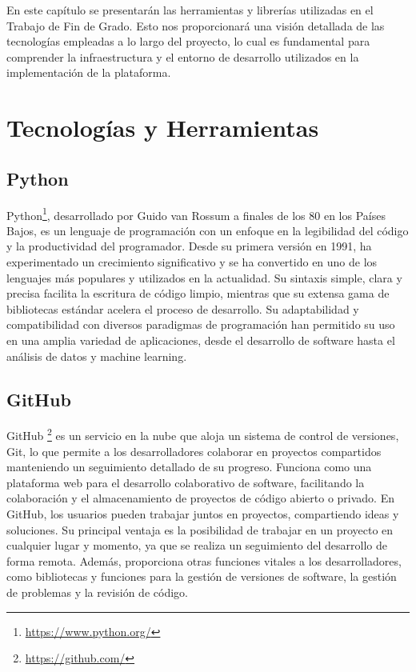 \documentclass[a4paper, 12pt]{book}
\begin{document}
En este capítulo se presentarán las herramientas y librerías utilizadas en el Trabajo de Fin de Grado. Esto nos proporcionará una visión detallada de las tecnologías empleadas a lo largo del proyecto, lo cual es fundamental para comprender la infraestructura y el entorno de desarrollo utilizados en la implementación de la plataforma.

\section{Tecnologías y Herramientas}
\label{sec:tecnologias y herramientas}

\subsection{Python} 
\label{subsec:Python} 
Python\footnote{\url{https://www.python.org/}}, desarrollado por Guido van Rossum a finales de los 80 en los Países Bajos, es un lenguaje 
de programación con un enfoque en la legibilidad del código y la productividad del programador. Desde su primera versión en 1991, ha 
experimentado un crecimiento significativo y se ha convertido en uno de los lenguajes más populares y utilizados en la actualidad. Su sintaxis simple, 
clara y precisa facilita la escritura de código limpio, mientras que su extensa gama de bibliotecas estándar acelera el proceso de desarrollo. 
Su adaptabilidad y compatibilidad con diversos paradigmas de programación han permitido su uso en una amplia variedad de aplicaciones, desde el 
desarrollo de software hasta el análisis de datos y machine learning.

\subsection{GitHub} 
\label{subsec:github} 
GitHub \footnote{\url{https://github.com/}} es un servicio en la nube que aloja un sistema de control de versiones, Git, lo que permite a los 
desarrolladores colaborar en proyectos compartidos manteniendo un seguimiento detallado de su progreso. Funciona como una plataforma web para el 
desarrollo colaborativo de software, facilitando la colaboración y el almacenamiento de proyectos de código abierto o privado. En GitHub, los usuarios 
pueden trabajar juntos en proyectos, compartiendo ideas y soluciones. Su principal ventaja es la posibilidad de trabajar en un proyecto en cualquier 
lugar y momento, ya que se realiza un seguimiento del desarrollo de forma remota. Además, proporciona otras funciones vitales a los desarrolladores, 
como bibliotecas y funciones para la gestión de versiones de software, la gestión de problemas y la revisión de código.\cite{tfg-karol}
\end{document}
